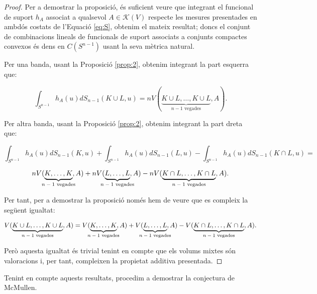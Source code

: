 \documentclass{article}
\theoremstyle{definition}
\begin{document}
\begin{proof}
Per a demostrar la proposici\'{o}, \'{e}s suficient veure que integrant el funcional de suport $h_A$ associat a qualsevol $A \in \mathcal{K}(V)$ respecte les mesures presentades en ambd\'{o}s costats de l'Equaci\'{o} \eqref{eq:S}, obtenim el mateix resultat; doncs el conjunt de combinacions lineals de funcionals de suport associats a conjunts compactes convexos \'{e}s dens en $C(S^{n-1})$ usant la seva m\`{e}trica natural.

Per una banda, usant la Proposici\'{o} \ref{prop:2}, obtenim integrant la part esquerra que:

\[ \int_{S^{n-1}} h_A(u) dS_{n-1} (K \cup L,u) = n V(\underbrace{K \cup L, \dots, K \cup L}_{\text{$n-1$ vegades}}, A).\]

Per altra banda, usant la Proposici\'{o} \ref{prop:2}, obtenim integrant la part dreta que:

\begin{equation*}
 \int_{S^{n-1}} h_A(u) dS_{n-1} (K,u) + \int_{S^{n-1}} h_A(u) dS_{n-1} (L,u) - \int_{S^{n-1}} h_A(u) dS_{n-1} (K \cap L,u) =   
\end{equation*}

\begin{equation*}
n V(\underbrace{K, \dots, K}_{\mathclap{\text{$n-1$ vegades}}}, A) + nV(\underbrace{L, \dots, L}_{\mathclap{\text{$n-1$ vegades}}}, A) - nV(\underbrace{K \cap L, \dots, K \cap L}_{\text{$n-1$ vegades}}, A). 
\end{equation*}

Per tant, per a demostrar la proposici\'{o} nom\'{e}s hem de veure que es compleix la seg\"{u}ent igualtat:

\[ V(\underbrace{K \cup L, \dots, K \cup L}_{\text{$n-1$ vegades}}, A) = V(\underbrace{K, \dots, K}_{\mathclap{\text{$n-1$ vegades}}}, A) + V(\underbrace{L, \dots, L}_{\mathclap{\text{$n-1$ vegades}}}, A) - V(\underbrace{K \cap L, \dots, K \cap L}_{\text{$n-1$ vegades}}, A). \]

Per\`{o} aquesta igualtat \'{e}s trivial tenint en compte que els volums mixtes s\'{o}n valoracions i, per tant, compleixen la propietat additiva presentada.
\end{proof}

Tenint en compte aquests resultats, procedim a demostrar la conjectura de McMullen.
\end{document}
